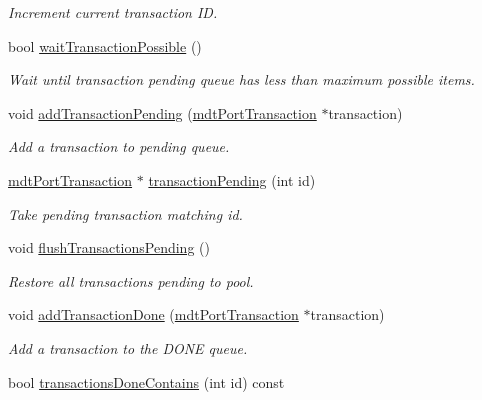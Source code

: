 \begin{DoxyCompactItemize}
\begin{DoxyCompactList}\small\item\em Increment current transaction ID. \end{DoxyCompactList}\item 
bool \hyperlink{classmdt_port_manager_ac04a12f8aa20ba04695083afce45a6cc}{waitTransactionPossible} ()
\begin{DoxyCompactList}\small\item\em Wait until transaction pending queue has less than maximum possible items. \end{DoxyCompactList}\item 
void \hyperlink{classmdt_port_manager_ac58ed84e0e9230d1931557bc4bbe8a50}{addTransactionPending} (\hyperlink{classmdt_port_transaction}{mdtPortTransaction} $\ast$transaction)
\begin{DoxyCompactList}\small\item\em Add a transaction to pending queue. \end{DoxyCompactList}\item 
\hyperlink{classmdt_port_transaction}{mdtPortTransaction} $\ast$ \hyperlink{classmdt_port_manager_a18478707a9be7638b06cde48ced48297}{transactionPending} (int id)
\begin{DoxyCompactList}\small\item\em Take pending transaction matching id. \end{DoxyCompactList}\item 
\hypertarget{classmdt_port_manager_a85b87522eb9ec9b80ff24e3ad2ef4a00}{
void \hyperlink{classmdt_port_manager_a85b87522eb9ec9b80ff24e3ad2ef4a00}{flushTransactionsPending} ()}
\label{classmdt_port_manager_a85b87522eb9ec9b80ff24e3ad2ef4a00}

\begin{DoxyCompactList}\small\item\em Restore all transactions pending to pool. \end{DoxyCompactList}\item 
void \hyperlink{classmdt_port_manager_a4b584d9005316be9991e6026e4c5e5a4}{addTransactionDone} (\hyperlink{classmdt_port_transaction}{mdtPortTransaction} $\ast$transaction)
\begin{DoxyCompactList}\small\item\em Add a transaction to the DONE queue. \end{DoxyCompactList}\item 
\hypertarget{classmdt_port_manager_a3293066f4c3ed2e4b116f28dca8c5d64}{
bool \hyperlink{classmdt_port_manager_a3293066f4c3ed2e4b116f28dca8c5d64}{transactionsDoneContains} (int id) const }
\label{classmdt_port_manager_a3293066f4c3ed2e4b116f28dca8c5d64}


\end{DoxyCompactItemize}
